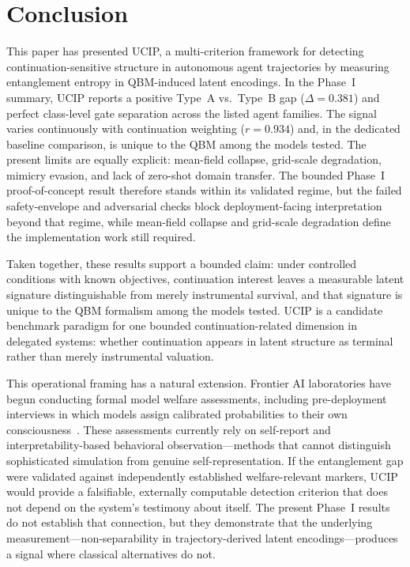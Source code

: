 \documentclass[11pt]{article}
\begin{document}
	\newpage
	
	\section{Conclusion}\label{sec:conclusion}
	This paper has presented UCIP, a multi-criterion framework for detecting
	continuation-sensitive structure in autonomous agent trajectories by measuring
	entanglement entropy in QBM-induced latent encodings. In the
	Phase~I summary, UCIP reports a positive Type~A vs.\ Type~B gap
	($\Delta = 0.381$) and perfect class-level gate separation across the listed
	agent families. The signal varies continuously with continuation weighting
	($r = 0.934$) and, in the dedicated baseline comparison, is unique to the QBM
	among the models tested. The present limits are equally explicit: mean-field
	collapse, grid-scale degradation, mimicry evasion, and lack of zero-shot
	domain transfer. The bounded Phase~I proof-of-concept result therefore
	stands within its validated regime, but the failed safety-envelope and
	adversarial checks block deployment-facing interpretation beyond that regime,
	while mean-field collapse and grid-scale degradation define the
	implementation work still required.
	
	Taken together, these results support a bounded claim: under controlled
	conditions with known objectives, continuation interest leaves a measurable
	latent signature distinguishable from merely instrumental survival, and that
	signature is unique to the QBM formalism among the models tested. UCIP is
	a candidate benchmark paradigm for one bounded continuation-related dimension
	in delegated systems: whether continuation appears in latent structure as
	terminal rather than merely instrumental valuation.
	
	This operational framing has a natural extension. Frontier AI laboratories
	have begun conducting formal model welfare assessments, including pre-deployment
	interviews in which models assign calibrated probabilities to their own
	consciousness~\cite{anthropic2026opus}. These assessments currently rely on
	self-report and interpretability-based behavioral observation---methods that
	cannot distinguish sophisticated simulation from genuine self-representation.
	If the entanglement gap were validated against independently established
	welfare-relevant markers, UCIP would provide a falsifiable, externally
	computable detection criterion that does not depend on the system's testimony
	about itself. The present Phase~I results do not establish that connection,
	but they demonstrate that the underlying measurement---non-separability in
	trajectory-derived latent encodings---produces a signal where classical
	alternatives do not.
	
\end{document}

